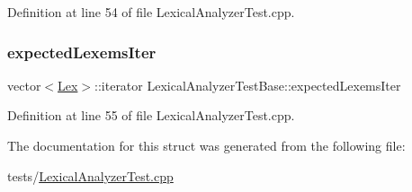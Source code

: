 Definition at line 54 of file Lexical\+Analyzer\+Test.\+cpp.

\mbox{\label{struct_lexical_analyzer_test_base_a38cbed88c599877db18b7b7522f6b65f}} 
\subsubsection{\texorpdfstring{expected\+Lexems\+Iter}{expectedLexemsIter}}
{\footnotesize\ttfamily vector$<$\hyperlink{classteam22_1_1_calc_1_1_lex}{Lex}$>$\+::iterator Lexical\+Analyzer\+Test\+Base\+::expected\+Lexems\+Iter}



Definition at line 55 of file Lexical\+Analyzer\+Test.\+cpp.



The documentation for this struct was generated from the following file\+:\begin{DoxyCompactItemize}
\item 
tests/\hyperlink{_lexical_analyzer_test_8cpp}{Lexical\+Analyzer\+Test.\+cpp}\end{DoxyCompactItemize}
